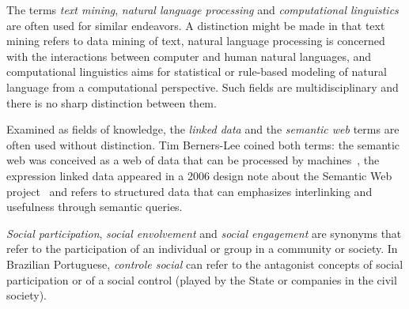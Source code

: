 
The terms \emph{text mining}, \emph{natural language processing} and \emph{computational linguistics}
are often used for similar endeavors.
A distinction might be made in that text mining refers to data mining of text,
natural language processing is concerned with the interactions between computer and human natural languages,
and computational linguistics aims for statistical or rule-based modeling of natural language from a computational perspective.
Such fields are multidisciplinary and there is no sharp distinction between them.

Examined as fields of knowledge, the \emph{linked data} and the \emph{semantic web}
terms are often used without distinction.
Tim Berners-Lee coined both terms: 
the semantic web was conceived as a web of data that can be processed by machines~\cite{lee0},
the expression linked data appeared in a 2006 design note about the Semantic Web project~\cite{lee1}
and refers to structured data that can emphasizes interlinking and usefulness through semantic queries.

\emph{Social participation}, \emph{social envolvement} and \emph{social engagement} are synonyms that
refer to the participation of an individual or group in a community or society.
In Brazilian Portuguese, \emph{controle social} can refer to the antagonist concepts of social participation
or of a social control (played by the State or companies in the civil society).

